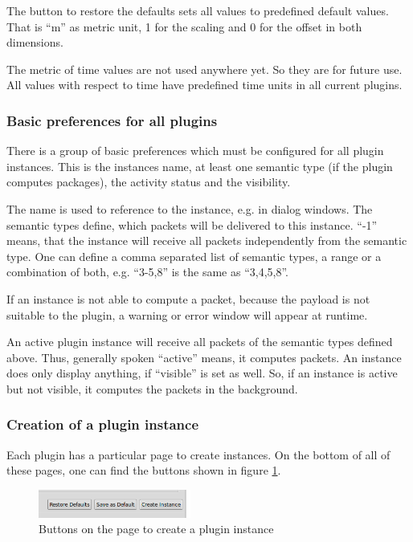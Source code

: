 The button to restore the defaults sets all values to predefined default values. That is ``m'' as metric unit, 1 for the scaling
and 0 for the offset in both dimensions.

The metric of time values are not used anywhere yet. So they are for future use. All values with respect to time have predefined
time units in all current plugins.

\subsubsection{Basic preferences for all plugins}
There is a group of basic preferences which must be configured for all plugin instances. This is the instances name,
at least one semantic type (if the plugin computes packages), the activity status and the visibility.

The name is used to reference to the instance, e.g. in dialog windows. The semantic types define, which packets
will be delivered to this instance. ``-1'' means, that the instance will receive all packets independently from the
semantic type. One can define a comma separated list of semantic types, a range or a combination of both, e.g.
``3-5,8'' is the same as ``3,4,5,8''.

If an instance is not able to compute a packet, because the payload is not
suitable to the plugin, a warning or error window will appear at runtime.

An active plugin instance will receive all packets of the semantic types defined above. Thus, generally spoken
``active'' means, it computes packets. An instance does only display anything, if ``visible'' is set as well.
So, if an instance is active but not visible, it computes the packets in the background.

\subsubsection{Creation of a plugin instance}

Each plugin has a particular page to create instances. On the bottom of all of these pages, one can find the buttons
shown in figure \ref{pic:instance_creation_buttons}.

\begin{figure}[htb]
  \begin{center}
    \includegraphics[width=5cm]{./pics/plugin_creation_buttons}
    \caption{Buttons on the page to create a plugin instance}
    \label{pic:instance_creation_buttons}
  \end{center}
\end{figure}

